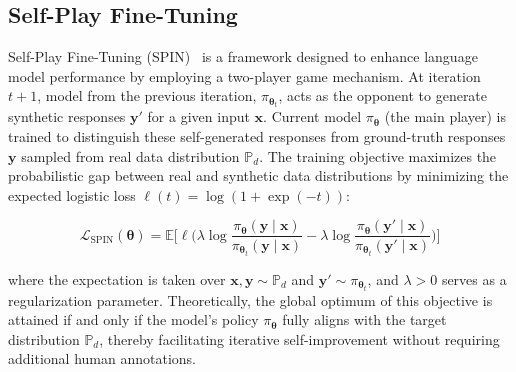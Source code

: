 \subsection{Self-Play Fine-Tuning}

Self-Play Fine-Tuning (SPIN)~\citep{chen2024self, le2025token, wang2026triplets} is a framework designed to enhance language model performance by employing a two-player game mechanism. At iteration $t+1$, model from the previous iteration, $\pi_{\boldsymbol{\theta}_t}$, acts as the opponent to generate synthetic responses $\mathbf{y}'$ for a given input $\mathbf{x}$. 
Current model $\pi_{\boldsymbol{\theta}}$ (the main player) is trained to distinguish these self-generated responses from ground-truth responses $\mathbf{y}$ sampled from real data distribution $\mathbb{P}_d$.  The training objective maximizes the probabilistic gap between real and synthetic data distributions by minimizing the expected logistic loss $\ell(t) = \log(1+\exp(-t))$:

\begin{equation}
\mathcal{L}_{\text{SPIN}}(\boldsymbol{\theta})
=
\mathbb{E}
\Bigg[
\ell \Bigg(
\lambda \log \frac{\pi_{\boldsymbol{\theta}}(\mathbf{y} \mid \mathbf{x})}
{\pi_{\boldsymbol{\theta}_t}(\mathbf{y} \mid \mathbf{x})}
-
\lambda \log \frac{\pi_{\boldsymbol{\theta}}(\mathbf{y}' \mid \mathbf{x})}
{\pi_{\boldsymbol{\theta}_t}(\mathbf{y}' \mid \mathbf{x})}
\Bigg)
\Bigg]
\end{equation}

where the expectation is taken over $\mathbf{x}, \mathbf{y} \sim \mathbb{P}_d$ and $\mathbf{y}' \sim \pi_{\boldsymbol{\theta}_t}$, and $\lambda > 0$ serves as a regularization parameter. Theoretically, the global optimum of this objective is attained if and only if the model's policy $\pi_{\boldsymbol{\theta}}$ 
fully aligns with the target distribution $\mathbb{P}_d$, thereby facilitating iterative self-improvement without requiring additional human annotations.